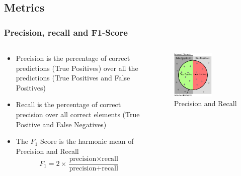 \documentclass[aspectratio=169]{beamer}
\begin{document}
\subsection{Metrics}
\begin{frame}
	\frametitle{Precision, recall and F1-Score}

	\begin{columns}[T] %
		\begin{column}{.48\textwidth}
			\begin{itemize}
				\item Precision is the percentage of correct predictions (True Positives) over all the predictions (True Positives and False Positives)
				\item Recall is the percentage of correct precision over all correct elements (True Positive and False Negatives)
				\item The $F_1$ Score is the harmonic mean of Precision and Recall
					\begin{equation}
						F_1 = 2 \times \frac{\text{precision} \times \text{recall}}{\text{precision} + \text{recall}}
					\end{equation}
			\end{itemize}
		\end{column}%
		\hfill%
		\begin{column}{.48\textwidth}
			\begin{figure}
				\centering
				\includegraphics[width=0.6\textwidth]{precisionRecall}
				\caption[]{Precision and Recall}
				\label{}
			\end{figure}
		\end{column}%
	\end{columns}
\end{frame}
\end{document}
